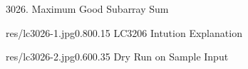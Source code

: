 \begin{problem}{3026. Maximum Good Subarray Sum}
    

\end{problem}

\begin{solution}[Ad-Hoc | $O(n^2)$ ]


    \begin{lfigurecp}{res/lc3026-1.jpg}{0.80}{0.15}
        LC3206 Intution Explanation
    \end{lfigurecp}


    \begin{lfigurecp}{res/lc3026-2.jpg}{0.60}{0.35}
        Dry Run on Sample Input
    \end{lfigurecp}
\end{solution}
    